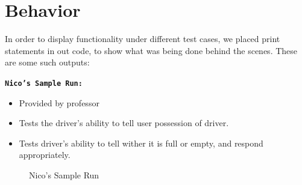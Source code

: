 \documentclass[11pt]{article}
\begin{document}
\newpage

\section{Behavior}
\begin{adjustwidth}{.2in}{}{

      \vspace{-5mm}

      In order to display functionality under different test cases, we placed
      print statements in out code, to show what was being done behind the
      scenes. These are some such outputs:


      {\tt \bf Nico's Sample Run: }

         \vspace{-5mm}
         \begin{itemize} 
         
            \item Provided by professor

            \item Tests the driver's ability to tell user possession of driver.  

            \item Tests driver's ability to tell wither it is full or empty,
               and respond appropriately.

         \end{itemize}


      \begin{figure}[H]
         \centering
         \caption{Nico's Sample Run}
         \label{fig:latex}
      \end{figure}

}
\end{adjustwidth}
\end{document}
